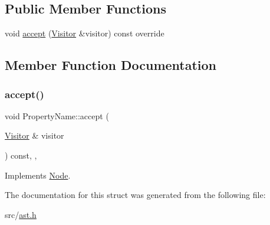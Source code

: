 \subsection*{Public Member Functions}
\begin{DoxyCompactItemize}
\item 
void \hyperlink{struct_property_name_a95857be8c40022cf788e3b11aa70cdc7}{accept} (\hyperlink{struct_visitor}{Visitor} \&visitor) const override
\end{DoxyCompactItemize}


\subsection{Member Function Documentation}
\mbox{\label{struct_property_name_a95857be8c40022cf788e3b11aa70cdc7}} 
\subsubsection{\texorpdfstring{accept()}{accept()}}
{\footnotesize\ttfamily void Property\+Name\+::accept (\begin{DoxyParamCaption}\item[{\hyperlink{struct_visitor}{Visitor} \&}]{visitor }\end{DoxyParamCaption}) const\hspace{0.3cm}{\ttfamily [inline]}, {\ttfamily [override]}, {\ttfamily [virtual]}}



Implements \hyperlink{struct_node_a10bd7af968140bbf5fa461298a969c71}{Node}.



The documentation for this struct was generated from the following file\+:\begin{DoxyCompactItemize}
\item 
src/\hyperlink{ast_8h}{ast.\+h}\end{DoxyCompactItemize}

